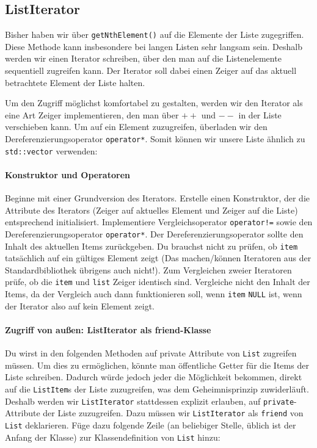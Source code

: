\subsection{ListIterator}
Bisher haben wir über \lstinline{getNthElement()} auf die Elemente der Liste zugegriffen.
Diese Methode kann insbesondere bei langen Listen sehr langsam sein.
Deshalb werden wir einen Iterator schreiben, über den man auf die Listenelemente sequentiell zugreifen kann.
Der Iterator soll dabei einen Zeiger auf das aktuell betrachtete Element der Liste halten.

Um den Zugriff möglichst komfortabel zu gestalten, werden wir den Iterator als eine Art Zeiger implementieren, den man über \textbf{$++$} und \textbf{$--$} in der Liste verschieben kann.
Um auf ein Element zuzugreifen, überladen wir den Dereferenzierungsoperator \lstinline{operator*}.
Somit können wir unsere Liste ähnlich zu \lstinline{std::vector} verwenden:


\paragraph{Konstruktor und Operatoren} 
Beginne mit einer Grundversion des Iterators.
Erstelle einen Konstruktor, der die Attribute des Iterators (Zeiger auf aktuelles Element und Zeiger auf die Liste) entsprechend initialisiert.
Implementiere Vergleichsoperator \lstinline{operator!=} sowie den Dereferenzierungsoperator \lstinline{operator*}.
Der Dereferenzierungsoperator sollte den Inhalt des aktuellen Items zurückgeben.
Du brauchst nicht zu prüfen, ob \lstinline{item} tatsächlich auf ein gültiges Element zeigt (Das machen/können Iteratoren aus der Standardbibliothek übrigens auch nicht!).
Zum Vergleichen zweier Iteratoren prüfe, ob die \lstinline{item} und \lstinline{list} Zeiger identisch sind.
Vergleiche nicht den Inhalt der Items, da der Vergleich auch dann funktionieren soll, wenn \lstinline{item} \lstinline{NULL} ist, wenn der Iterator also auf kein Element zeigt.


\paragraph{Zugriff von außen: ListIterator als friend-Klasse} Du wirst in den folgenden Methoden auf private Attribute von \lstinline{List} zugreifen müssen.
Um dies zu ermöglichen, könnte man öffentliche Getter für die Items der Liste schreiben.
Dadurch würde jedoch jeder die Möglichkeit bekommen, direkt auf die \lstinline{ListItem}s der Liste zuzugreifen, was dem Geheimnisprinzip zuwiderläuft.
Deshalb werden wir \lstinline{ListIterator} stattdessen explizit erlauben, auf \lstinline{private}-Attribute der Liste zuzugreifen.
Dazu müssen wir \lstinline{ListIterator} als \lstinline{friend} von \lstinline{List} deklarieren.
Füge dazu folgende Zeile (an beliebiger Stelle, üblich ist der Anfang der Klasse) zur Klassendefinition von \lstinline{List} hinzu:


